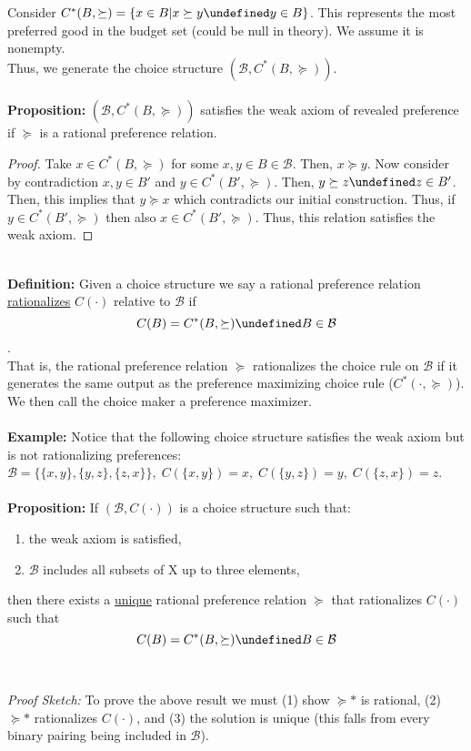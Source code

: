 \documentclass[12pt]{article}
\let\oldforall\forall
\let\forall\undefined
\DeclareMathOperator{\forall}{\,\oldforall\,}
\begin{document}
Consider $C^*(B, \succeq) = \{x \in B | x \succeq y \forall y \in B\}$. This represents the most preferred good in the budget set (could be null in theory). We assume it is nonempty.
\\Thus, we generate the choice structure $(\mathcal{B}, C^*(B, \succeq))$.
\\ \textbf{\\Proposition:} $(\mathcal{B}, C^*(B, \succeq))$ satisfies the weak axiom of revealed preference if $\succeq$ is a rational preference relation.
\begin{proof}
Take $x \in C^*(B, \succeq)$ for some $x,y \in B \in \mathcal{B}$. Then, $x \succeq y$. Now consider by contradiction $x,y \in B'$ and $y \in C^*(B', \succeq)$. Then, $y \succeq z \forall z \in B'$. Then, this implies that $y \succeq x$ which contradicts our initial construction. Thus, if $y \in C^*(B', \succeq)$ then also $x \in C^*(B', \succeq)$. Thus, this relation satisfies the weak axiom. 
\end{proof}
\textbf{\\Definition:} Given a choice structure we say a rational preference relation \underline{rationalizes} $C(\cdot)$ relative to $\mathcal{B}$ if 
$$C(B) = C^*(B, \succeq) \forall B \in \mathcal{B}$$. 
\\That is, the rational preference relation $\succeq$ rationalizes the choice rule on $\mathcal{B}$ if it generates the same output as the preference maximizing choice rule ($C^*(\cdot, \succeq)$). We then call the choice maker a preference maximizer.
\\\textbf{\\Example:} Notice that the following choice structure satisfies the weak axiom but is not rationalizing preferences: $\mathcal{B} = \{\{x,y\}, \{y,z\}, \{z,x\}\}, \; C(\{x,y\}) = x, \; C(\{y,z\}) = y, \; C(\{z,x\}) = z$.
\\ \textbf{\\Proposition:} If $(\mathcal{B}, C(\cdot))$ is a choice structure such that:
\begin{enumerate}[1.]
	\item the weak axiom is satisfied,
	\item $\mathcal{B}$ includes all subsets of X up to three elements,
\end{enumerate}
then there exists a \underline{unique} rational preference relation $\succeq$ that rationalizes $C(\cdot)$ such that 
$$C(B) = C^*(B, \succeq) \forall B\in \mathcal{B}$$
\\ \emph{\\Proof Sketch:} To prove the above result we must (1) show $\succeq*$ is rational, (2) $\succeq*$ rationalizes $C(\cdot)$, and (3) the solution is unique (this falls from every binary pairing being included in $\mathcal{B}$).
\end{document}

